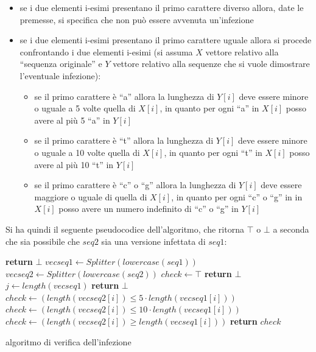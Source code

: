 \documentclass[a4paper,12pt, oneside]{book}
\begin{document}
\begin{itemize}
  \item se i due elementi i-esimi presentano il primo carattere diverso allora,
  date le premesse, si specifica che non può essere avvenuta un'infezione
  \item se i due elementi i-esimi presentano il primo carattere uguale allora si
  procede confrontando i due elementi i-esimi (si assuma $X$ vettore relativo
  alla ``sequenza originale'' e $Y$ vettore relativo alla sequenze che si vuole
  dimostrare l'eventuale infezione):
  \begin{itemize}
    \item se il primo carattere è ``a'' allora la lunghezza di $Y[i]$ deve
    essere minore o uguale a 5 volte quella di $X[i]$, in quanto per ogni ``a''
    in $X[i]$ posso avere al più 5 ``a'' in $Y[i]$
    \item se il primo carattere è ``t'' allora la lunghezza di $Y[i]$ deve
    essere minore o uguale a 10 volte quella di $X[i]$, in quanto per ogni ``t''
    in $X[i]$ posso avere al più 10 ``t'' in $Y[i]$
    \item se il primo carattere è ``c'' o ``g'' allora la lunghezza di $Y[i]$
    deve essere maggiore o uguale di quella di $X[i]$, in quanto per ogni ``c''
    o ``g'' in  in $X[i]$ posso avere un numero indefinito di ``c'' o ``g'' in
    $Y[i]$ 
  \end{itemize}
\end{itemize}
\newpage
Si ha quindi il seguente pseudocodice dell'algoritmo, che ritorna $\top$ o
$\bot$ a seconda che sia possibile che $seq2$ sia una versione infettata di
$seq1$:
\begin{algorithm}[H]
  \begin{algorithmic}
    \State \textbf{return} $\bot$
    \EndIf
    \State $vecseq1\gets Splitter(lowercase(seq1))$
    \State $vecseq2\gets Splitter(lowercase(seq2))$
    \State $check \gets \top$
    \State \textbf{return} $\bot$
    \EndIf
    \State $j \gets length(vecseq1)$
    \State \textbf{return} $\bot$
    \EndIf
    \State $check \gets (length(vecseq2[i]) \leq 5\cdot length(vecseq1[i]))$
    \State $check \gets (length(vecseq2[i]) \leq 10\cdot length(vecseq1[i]))$
    \Else
    \State $check \gets (length(vecseq2[i]) \geq length(vecseq1[i]))$
    \EndIf
    \EndFor
    \State \textbf{return} $check$
    \EndFunction
  \end{algorithmic}
  \caption{algoritmo di verifica dell'infezione}
\end{algorithm}
\end{document}
